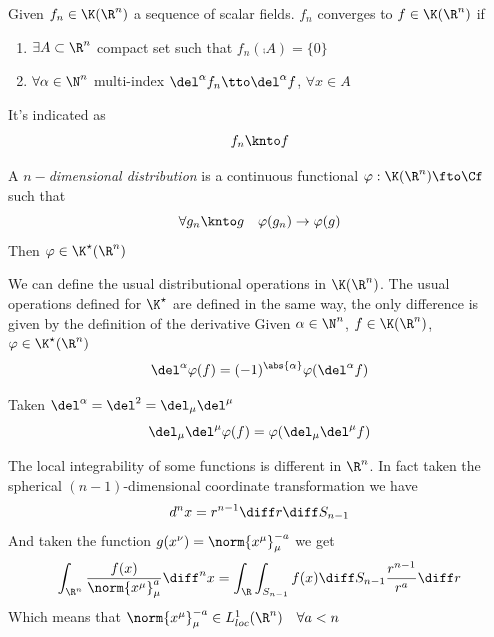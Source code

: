 \documentclass[../mmf.tex]{subfiles}
\begin{document}
\begin{dfn}[$\K(\R^n)-$Convergence]
	Given $f_n\in\K(\R^n)$ a sequence of scalar fields. $f_n$ converges to $f\in\K(\R^n)$ if
	\begin{enumerate}
	\item $\exists A\subset\R^n$ compact set such that $f_n\left( \comp{A} \right)=\{0\}$
	\item $\forall\alpha\in\N^n$ multi-index $\del^\alpha f_n\tto\del^\alpha f$, $\forall x\in A$
	\end{enumerate}
	It's indicated as
	\begin{equation*}
		f_n\knto f
	\end{equation*}
\end{dfn}
\begin{dfn}
	A $n-$\textit{dimensional distribution} is a continuous functional $\varphi:\K(\R^n)\fto\Cf$ such that
	\begin{equation}
		\forall g_n\knto g\quad \varphi(g_n)\to\varphi(g)
		\label{eq:ndimdist}
	\end{equation}
	Then $\varphi\in\K^\star(\R^n)$
\end{dfn}
\begin{thm}
	We can define the usual distributional operations in $\K(\R^n)$. The usual operations defined for $\K^\star$ are defined in the same way, the only difference is given by the definition of the derivative
	Given $\alpha\in\N^n$, $f\in\K(\R^n)$, $\varphi\in\K^\star(\R^n)$
	\begin{equation}
		\del^\alpha\varphi(f)=(-1)^{\abs{\alpha}}\varphi(\del^\alpha f)
		\label{eq:distderrn}
	\end{equation}
\end{thm}
\begin{eg}
	Taken $\del^\alpha=\del^2=\del_\mu\del^\mu$
	\begin{equation*}
		\del_\mu\del^\mu\varphi(f)=\varphi(\del_\mu\del^\mu f)
	\end{equation*}
\end{eg}
\begin{rmk}
	The local integrability of some functions is different in $\R^n$. In fact taken the spherical $(n-1)$-dimensional coordinate transformation we have
	\begin{equation*}
		d^nx=r^{n-1}\diff r\diff S_{n-1}
	\end{equation*}
	And taken the function $g(x^\nu)=\norm{x^\mu}_\mu^{-a}$ we get
	\begin{equation*}
		\int_{\R^n}^{}\frac{f(x)}{\norm{x^\mu}_\mu^a}\diff^nx=\int_{\R}^{}\int_{S_{n-1}}f(x)\diff S_{n-1}\frac{r^{n-1}}{r^a}\diff r
	\end{equation*}
	Which means that $\norm{x^\mu}_\mu^{-a}\in L^1_{loc}(\R^n)\quad\forall a<n$
\end{rmk}
\end{document}
